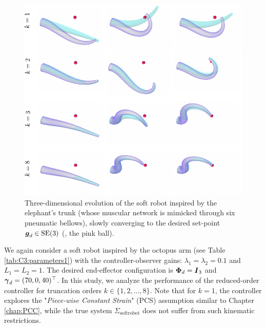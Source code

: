 %
\begin{figure}[!t]
  \centering
  \vspace{-2mm}
  \includegraphics*[width=1.04\textwidth]{./pdf/thesis-figure-5-13.pdf}
  \vspace{-5mm}
  \caption{\small Three-dimensional evolution of the soft robot inspired by the elephant's trunk (whose muscular network is mimicked through six pneumatic bellows), slowly converging to the desired set-point $\boldsymbol{g}_d \in \textup{\textrm{SE}}(3)$ (\ie, the pink ball). }
  \label{fig:C3:softarm_3D_truncation}
  \vspace{-6mm}
\end{figure}
%
We again consider a soft robot inspired by the octopus arm (see Table \ref{tab:C3:parameters1}) with the controller-observer gains: $\lambda_1 = \lambda_2 = 0.1$ and $L_1 = L_2 = 1$. The desired end-effector configuration is ${\boldsymbol{\Phi}}_d = {\boldsymbol{I}}_3$ and ${\boldsymbol{\gamma}}_d = (70, 0, 40)^\top$. In this study, we analyze the performance of the reduced-order controller for truncation orders $k \in \{1,2,...,8\}$. Note that for $k=1$, the controller explores the "\emph{Piece-wise Constant Strain}" (PCS) assumption similar to Chapter \ref{chap:PCC}, while the true system $\Sigma_{\textrm{softrobot}}$ does not suffer from such kinematic restrictions. %

